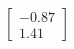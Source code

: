 \documentclass[preview]{standalone}
\begin{document}
\begin{align*}
\begin{bmatrix} -0.87 \\ 1.41 \end{bmatrix}
\end{align*}
\end{document}
